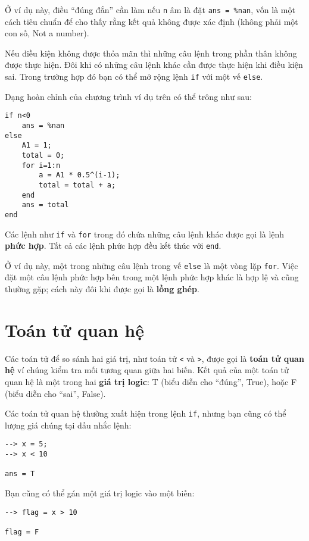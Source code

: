 \documentclass[12pt]{book}
\begin{document}
Ở ví dụ này, điều ``đúng đắn'' cần làm nếu {\tt n} âm là đặt
{\tt ans = \%nan}, vốn là một cách tiêu chuẩn để cho thấy rằng
kết quả không được xác định (không phải một con số, Not a number).

Nếu điều kiện không được thỏa mãn thì những câu lệnh trong phần thân
không được thực hiện. Đôi khi có những câu lệnh khác cần được
thực hiện khi điều kiện sai. Trong trường hợp đó bạn có thể
mở rộng lệnh {\tt if} với một vế {\tt else}.

Dạng hoàn chỉnh của chương trình ví dụ trên có thể trông như sau:

\begin{verbatim}
if n<0
    ans = %nan
else
    A1 = 1;
    total = 0;
    for i=1:n
        a = A1 * 0.5^(i-1);
        total = total + a;
    end
    ans = total
end
\end{verbatim}
%
Các lệnh như {\tt if} và {\tt for} trong đó chứa những câu lệnh khác
được gọi là lệnh {\bf phức hợp}. Tất cả các lệnh phức hợp đều 
kết thúc với {\tt end}.

Ở ví dụ này, một trong những câu lệnh trong vế {\tt else} là một 
vòng lặp {\tt for}. Việc đặt một câu lệnh phức hợp bên trong một
lệnh phức hợp khác là hợp lệ và cũng thường gặp; cách này đôi
khi được gọi là {\bf lồng ghép}.


\section{Toán tử quan hệ}

Các toán tử để so sánh hai giá trị, như toán tử {\tt <} và 
{\tt >}, được gọi là {\bf toán tử quan hệ} ví chúng kiểm tra 
mối tương quan giữa hai biến. Kết quả của một toán tử quan hệ
là một trong hai {\bf giá trị logic}: T (biểu diễn cho ``đúng'', True),
hoặc F (biểu diễn cho ``sai'', False).

Các toán tử quan hệ thường xuất hiện trong lệnh {\tt if},
nhưng bạn cũng có thể lượng giá chúng tại dấu nhắc lệnh:

\begin{verbatim}
--> x = 5;
--> x < 10

ans = T
\end{verbatim}

Bạn cũng có thể gán một giá trị logic vào một biến:

\begin{verbatim}
--> flag = x > 10

flag = F
\end{verbatim}
\end{document}
